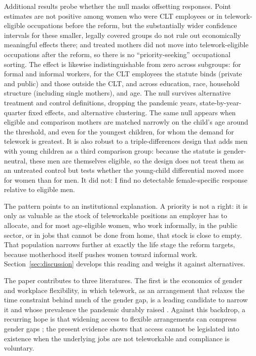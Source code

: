 \documentclass[12pt]{article}
\begin{document}
Additional results probe whether the null masks offsetting responses. Point estimates are not positive among women who were CLT employees or in telework-eligible occupations before the reform, but the substantially wider confidence intervals for these smaller, legally covered groups do not rule out economically meaningful effects there; and treated mothers did not move into telework-eligible occupations after the reform, so there is no ``priority-seeking'' occupational sorting. The effect is likewise indistinguishable from zero across subgroups: for formal and informal workers, for the CLT employees the statute binds (private and public) and those outside the CLT, and across education, race, household structure (including single mothers), and age. The null survives alternative treatment and control definitions, dropping the pandemic years, state-by-year-quarter fixed effects, and alternative clustering. The same null appears when eligible and comparison mothers are matched narrowly on the child's age around the threshold, and even for the youngest children, for whom the demand for telework is greatest. It is also robust to a triple-differences design that adds men with young children as a third comparison group: because the statute is gender-neutral, these men are themselves eligible, so the design does not treat them as an untreated control but tests whether the young-child differential moved more for women than for men. It did not: I find no detectable female-specific response relative to eligible men.

The pattern points to an institutional explanation. A priority is not a right: it is only as valuable as the stock of teleworkable positions an employer has to allocate, and for most age-eligible women, who work informally, in the public sector, or in jobs that cannot be done from home, that stock is close to empty. That population narrows further at exactly the life stage the reform targets, because motherhood itself pushes women toward informal work. Section~\ref{sec:discussion} develops this reading and weighs it against alternatives.

The paper contributes to three literatures. The first is the economics of gender and workplace flexibility, in which telework, as an arrangement that relaxes the time constraint behind much of the gender gap, is a leading candidate to narrow it \citep{goldin2014,maspallais2017,bloom2015,flabbimoro2012} and whose prevalence the pandemic durably raised \citep{barrero2023,dingelneiman2020}. Against this backdrop, a recurring hope is that widening access to flexible arrangements can compress gender gaps \citep{bertrand2011,blaukahn2017}; the present evidence shows that access cannot be legislated into existence when the underlying jobs are not teleworkable and compliance is voluntary.
\end{document}
